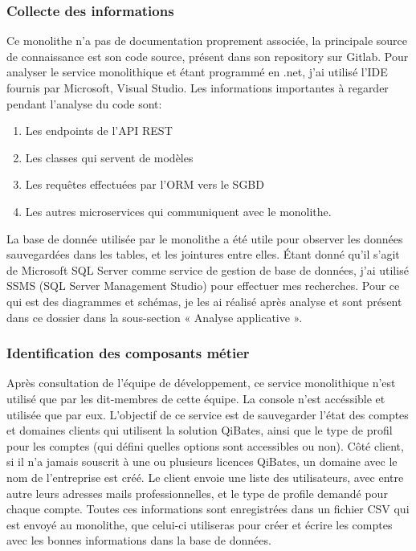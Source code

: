 \documentclass[a4paper, 11pt]{report}
\begin{document}
\subsubsection{Collecte des informations}
Ce monolithe n’a pas de documentation proprement associée, la principale source de connaissance est son code source, présent dans son repository sur Gitlab.
Pour analyser le service monolithique et étant programmé en .net, j’ai utilisé l’IDE fournis par Microsoft, Visual Studio.
Les informations importantes à regarder pendant l’analyse du code sont:
\begin{enumerate}
  \item Les endpoints de l’API REST
  \item Les classes qui servent de modèles
  \item Les requêtes effectuées par l’ORM vers le SGBD
  \item Les autres microservices qui communiquent avec le monolithe.
\end{enumerate}
La base de donnée utilisée par le monolithe a été utile pour observer les données sauvegardées dans les tables, et les jointures entre elles.
Étant donné qu’il s’agit de Microsoft SQL Server comme service de gestion de base de données, j’ai utilisé SSMS (SQL Server Management Studio) pour effectuer mes recherches.
Pour ce qui est des diagrammes et schémas, je les ai réalisé après analyse et sont présent dans ce dossier dans la sous-section « Analyse applicative ».
\subsubsection{Identification des composants métier}
Après consultation de l’équipe de développement, ce service monolithique n’est utilisé que par les dit-membres de cette équipe. La console n’est accéssible et utilisée que par eux.
L’objectif de ce service est de sauvegarder l’état des comptes et domaines clients qui utilisent la solution QiBates, ainsi que le type de profil pour les comptes (qui défini quelles options sont accessibles ou non).
Côté client, si il n’a jamais souscrit à une ou plusieurs licences QiBates, un domaine avec le nom de l’entreprise est créé. Le client envoie une liste des utilisateurs, avec entre autre leurs adresses mails professionnelles, et le type de profile demandé pour chaque compte.
Toutes ces informations sont enregistrées dans un fichier CSV qui est envoyé au monolithe, que celui-ci utiliseras pour créer et écrire les comptes avec les bonnes informations dans la base de données.
\end{document}
